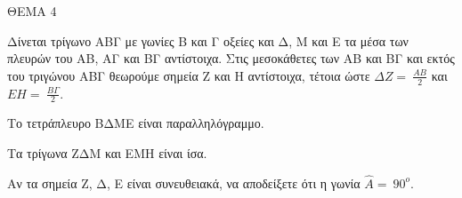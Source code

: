 
ΘΕΜΑ 4

Δίνεται τρίγωνο ΑΒΓ με γωνίες Β και Γ οξείες και Δ, Μ και Ε τα μέσα των πλευρών του ΑΒ, ΑΓ και ΒΓ αντίστοιχα. Στις μεσοκάθετες των ΑΒ και ΒΓ και εκτός του τριγώνου ΑΒΓ θεωρούμε σημεία Ζ και Η αντίστοιχα, τέτοια ώστε $\Delta Ζ = \ \frac{ΑΒ}{2}$ και $ΕΗ = \ \frac{Β\Gamma}{2}$.

\begin{alist}
\item Να αποδείξετε ότι:

.}
\end{alist}
\begin{alist}
\item
  Το τετράπλευρο ΒΔΜΕ είναι παραλληλόγραμμο. 
\item
  Τα τρίγωνα ΖΔΜ και ΕΜΗ είναι ίσα. 

\item Αν τα σημεία Ζ, Δ, Ε είναι συνευθειακά, να αποδείξετε ότι η γωνία $\widehat{Α} = \ 90^{ο}$. 


\end{alist}
